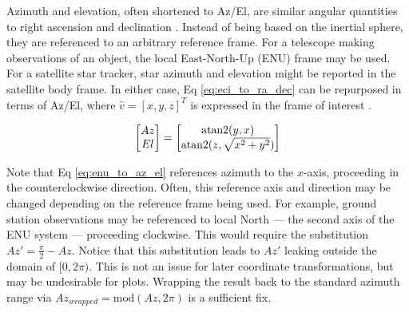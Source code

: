 Azimuth and elevation, often shortened to Az/El, are similar angular quantities to right ascension and declination \cite{frueh2019notes}. Instead of being based on
the inertial sphere, they are referenced to an arbitrary reference frame. For a telescope making
observations of an object, the local East-North-Up (ENU) frame may be used. For a satellite star
tracker, star azimuth and elevation might be reported in the satellite body frame. In either case,
Eq \ref{eq:eci_to_ra_dec} can be repurposed in terms of Az/El, where $\hat{v} = \left[ x, y, z
\right]^T$ is expressed in the frame of interest \cite{frueh2019notes}.

\begin{equation} \label{eq:enu_to_az_el}
  \begin{bmatrix}
	Az \\
	El
  \end{bmatrix} = 
  \begin{bmatrix}
	\operatorname{atan2}(y, x) \\
	\operatorname{atan2}(z, \sqrt{x^2 + y^2})
  \end{bmatrix}
\end{equation}

Note that Eq \ref{eq:enu_to_az_el} references azimuth to the $x$-axis, proceeding in the
counterclockwise direction. Often, this reference axis and direction may be changed depending on the
reference frame being used. For example, ground station observations may be referenced to local
North ---  the second axis of the ENU system ---  proceeding clockwise. This would require the
substitution $Az' = \frac{\pi}{2} - Az$. Notice that this substitution leads to $Az'$ leaking
outside the domain of $[0, 2\pi)$. This is not an issue for later coordinate transformations, but
may be undesirable for plots. Wrapping the result back to the standard azimuth range via
$Az_{wrapped} = \textrm{mod}(Az, 2\pi)$ is a sufficient fix.
